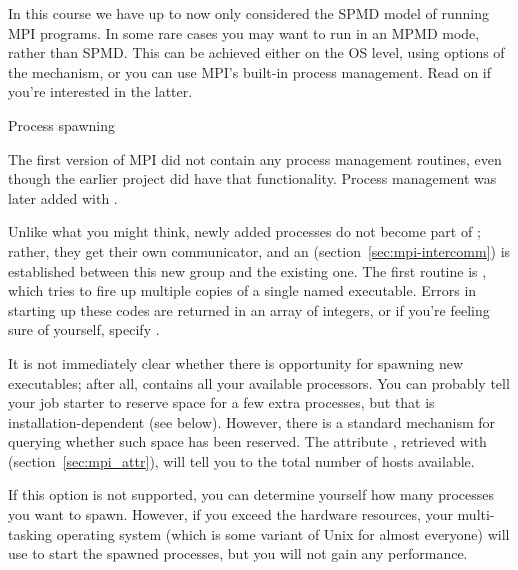 
In this course we have up to now only considered the \ac{SPMD} model
of running MPI programs.  In some rare cases you may want to run in an
\ac{MPMD} mode, rather than \ac{SPMD}. This can be achieved either on
the \ac{OS} level, using options of the  mechanism,
or you can use MPI's built-in process management. Read on if you're
interested in the latter.

 {Process spawning}
\label{sec:mpi-dynamic}

The first version of MPI did not contain any process management
routines, even though the earlier  project did have
that functionality. Process management was later added with .

Unlike what you might think, newly added processes do not become part
of ; rather, they get their own communicator, and an
 (section~\ref{sec:mpi-intercomm})
is established between this new group
and the existing one. The first routine is
, which tries to fire up multiple copies
of a single named executable.
Errors in starting up these codes are returned in an array of integers, or
if you're feeling sure of yourself, specify .

It is not immediately clear whether there is opportunity for spawning
new executables; after all,  contains all
your available processors. You can probably tell your job starter to
reserve space for a few extra processes, but that is
installation-dependent (see below). However, there is a standard
mechanism for querying whether such space has been reserved.  The
attribute , retrieved with
 (section~\ref{sec:mpi_attr}), will tell
you to the total number of hosts available.

If this option is not supported, you can determine yourself how many
processes you want to spawn.
However, if you exceed the hardware resources,
your multi-tasking operating system (which is some variant of Unix for
almost everyone) will use  to start the
spawned processes, but you will not gain any performance.

